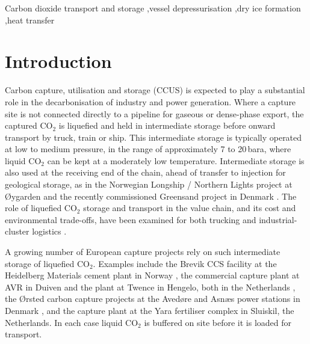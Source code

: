 \documentclass[5p,authoryear]{elsarticle}
\begin{document}
\begin{frontmatter}
\begin{keyword}
Carbon dioxide transport and storage \sep vessel depressurisation \sep dry ice formation \sep heat transfer
\end{keyword}

\end{frontmatter}

\linenumbers

\section{Introduction}
\label{sec:introduction}

Carbon capture, utilisation and storage (CCUS) is expected to play a substantial role in the
decarbonisation of industry and power generation. Where a capture site is not connected directly
to a pipeline for gaseous or dense-phase export, the captured CO$_2$ is liquefied and held in
intermediate storage before onward transport by truck, train or ship. This intermediate storage
is typically operated at low to medium pressure, in the range of approximately 7 to 20\,bara,
where liquid CO$_2$ can be kept at a moderately low temperature. Intermediate storage is also
used at the receiving end of the chain, ahead of transfer to injection for geological storage,
as in the Norwegian Longship / Northern Lights project at {\O}ygarden \citep{Helgesen2021} and
the recently commissioned Greensand project in Denmark \citep{Starodubtseva2024}. The role of
liquefied CO$_2$ storage and transport in the value chain, and its cost and environmental
trade-offs, have been examined for both trucking and industrial-cluster logistics
\citep{Ashkavand2025, Hennequin2026}.

A growing number of European capture projects rely on such intermediate storage of liquefied
CO$_2$. Examples include the Brevik CCS facility at the Heidelberg Materials cement plant in
Norway \citep{Burns2024}, the commercial capture plant at AVR in Duiven and the plant at Twence
in Hengelo, both in the Netherlands \citep{Ros2022}, the {\O}rsted carbon capture projects at
the Aved{\o}re and Asn{\ae}s power stations in Denmark \citep{HoeegJohansen2025}, and the capture
plant at the Yara fertiliser complex in Sluiskil, the Netherlands. In each case liquid CO$_2$ is
buffered on site before it is loaded for transport.
\end{document}
